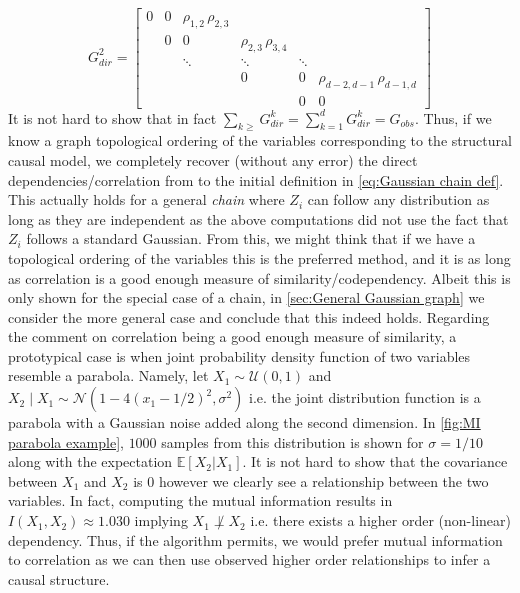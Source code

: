 \documentclass[../Thesis.tex]{subfiles}
\begin{document}
$$G_{dir}^2 = \begin{bmatrix}
        0 & 0 & \rho_{1,2}   \, \rho_{2,3} &                          &        &                               \\
          & 0 & 0                          & \rho_{2,3} \, \rho_{3,4} &        &                               \\
          &   & \ddots                     & \ddots                   & \ddots &                               \\
          &   &                            & 0                        & 0      & \rho_{d-2,d-1}\, \rho_{d-1,d} \\
          &   &                            &                          & 0      & 0
    \end{bmatrix}$$
It is not hard to show that in fact $\sum_{k\geq} G_{dir}^k = \sum_{k=1}^d G_{dir}^k = G_{obs}$. Thus, if we know a graph topological ordering of the variables corresponding to the structural causal model, we completely recover (without any error) the direct dependencies/correlation from to the initial definition in \autoref{eq:Gaussian chain def}. This actually holds for a general \textit{chain} where $Z_i$ can follow any distribution as long as they are independent as the above computations did not use the fact that $Z_i$ follows a standard Gaussian. From this, we might think that if we have a topological ordering of the variables this is the preferred method, and it is as long as correlation is a good enough measure of similarity/codependency. Albeit this is only shown for the special case of a chain, in \autoref{sec:General Gaussian graph} we consider the more general case and conclude that this indeed holds. Regarding the comment on correlation being a good enough measure of similarity, a prototypical case is when joint probability density function of two variables resemble a parabola. Namely, let $X_1\sim \mathcal{U}\left(0,1\right)$ and $X_2 \mid X_1 \sim \mathcal{N}\left(1 - 4\left(x_1 - 1/2\right)^2 , \sigma^2\right)$ i.e. the joint distribution function is a parabola with a Gaussian noise added along the second dimension. In \autoref{fig:MI parabola example}, $1000$ samples from this distribution is shown for $\sigma = 1/10$ along with the expectation $\mathbb{E}\left[X_2 | X_1\right]$. It is not hard to show that the covariance between $X_1$ and $X_2$ is $0$ however we clearly see a relationship between the two variables. In fact, computing the mutual information results in $I\left(X_1,X_2\right) \approx 1.030$ implying $X_1 \not\perp X_2$ i.e. there exists a higher order (non-linear) dependency. Thus, if the algorithm permits, we would prefer mutual information to correlation as we can then use observed higher order relationships to infer a causal structure.
\end{document}
